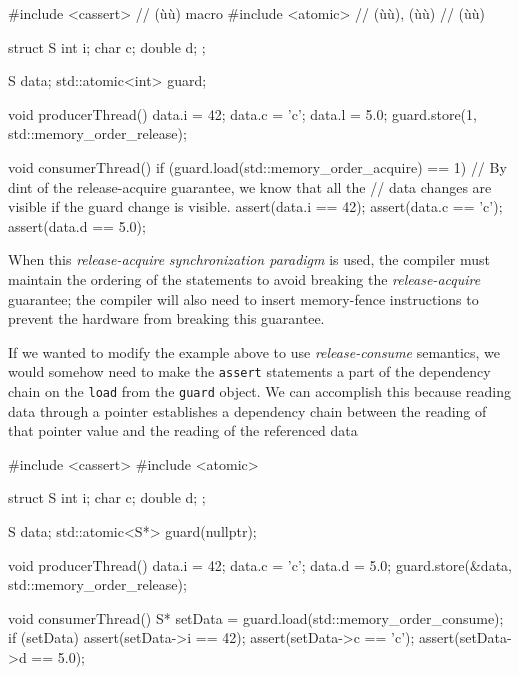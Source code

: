 \begin{emcppslisting}[language=C++]
#include <cassert>  // (ù{}ù) macro
#include <atomic>   // (ù{}ù), (ù{}ù)
                    // (ù{}ù)

struct S
{
    int i;
    char c;
    double d;
};

S data;
std::atomic<int> guard;

void producerThread()
{
    data.i = 42;
    data.c = 'c';
    data.l = 5.0;
    guard.store(1, std::memory_order_release);
}

void consumerThread()
{
    if (guard.load(std::memory_order_acquire) == 1)
    {
        // By dint of the release-acquire guarantee, we know that all the
        // data changes are visible if the guard change is visible.
        assert(data.i == 42);
        assert(data.c == 'c');
        assert(data.d == 5.0);
    }
}
\end{emcppslisting}
    
\noindent When this \emph{release-acquire} \emph{synchronization paradigm} is
used, the compiler must maintain the ordering of the statements to avoid
breaking the \emph{release-acquire} guarantee; the compiler will also
need to insert memory-fence instructions to prevent the hardware from
breaking this guarantee.

If we wanted to modify the example above to use \emph{release-consume}
semantics, we would somehow need to make the \lstinline!assert! statements
a part of the dependency chain on the \lstinline!load! from the
\lstinline!guard! object. We can accomplish this because reading data
through a pointer establishes a dependency chain between the reading of
that pointer value and the reading of the referenced data

\begin{emcppslisting}[language=C++]
#include <cassert>
#include <atomic>

struct S
{
    int i;
    char c;
    double d;
};

S data;
std::atomic<S*> guard(nullptr);

void producerThread()
{
    data.i = 42;
    data.c = 'c';
    data.d = 5.0;
    guard.store(&data, std::memory_order_release);
}

void consumerThread()
{
    S* setData = guard.load(std::memory_order_consume);
    if (setData)
    {
        assert(setData->i == 42);
        assert(setData->c == 'c');
        assert(setData->d == 5.0);
    }
}
\end{emcppslisting}
    
